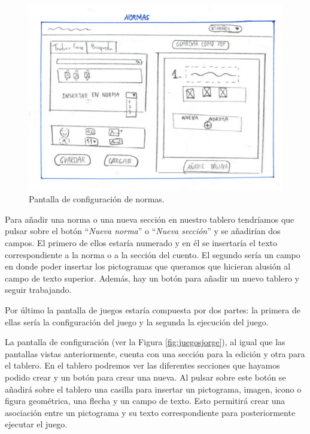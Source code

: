 	\begin{figure}[h!]
		\centering
		\includegraphics[width=0.7\linewidth]{Imagenes/Bitmap/normasJorge}
		\caption{Pantalla de configuración de normas.}
		\label{fig:normasjorge}
	\end{figure}


	
	Para añadir una norma o una nueva sección en nuestro tablero tendríamos que pulsar sobre el botón “\textit{Nueva norma}” o “\textit{Nueva sección}” y se añadirían dos campos. El primero de ellos estaría numerado y en él se insertaría el texto correspondiente a la norma o a la sección del cuento. El segundo sería un campo en donde poder insertar los pictogramas que queramos que hicieran alusión al campo de texto superior. Además, hay un botón para añadir un nuevo tablero y seguir trabajando.
	

	
	Por último la pantalla de juegos estaría compuesta por dos partes: la primera de ellas sería la configuración del juego y la segunda la ejecución del juego.
	
	
	La pantalla de configuración (ver la Figura \ref{fig:juegosjorge}), al igual que las pantallas vistas anteriormente, cuenta con una sección para la edición y otra para el tablero. En el tablero podremos ver las diferentes secciones que hayamos podido crear y un botón para crear una nueva. Al pulsar sobre este botón se añadirá sobre el tablero una casilla para insertar un pictograma, imagen, icono o figura geométrica, una flecha y un campo de texto. Esto permitirá crear una asociación entre un pictograma y su texto correspondiente para posteriormente ejecutar el juego.
	

